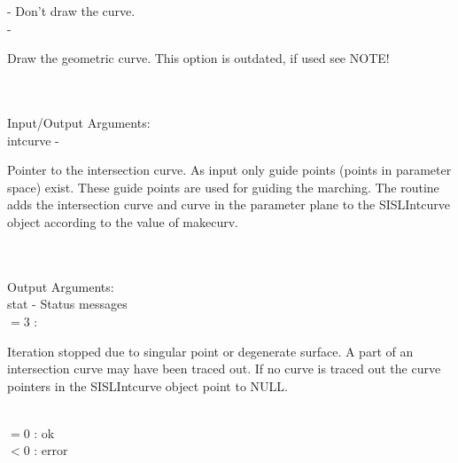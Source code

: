                 \>\>\>\> -     \>Don't draw the curve.\\
                \>\>\>\> -     \>\begin{minipg5}
                                        Draw the geometric curve. This option is
                                        outdated, if used see NOTE!
                                        \end{minipg5} \\[0.8ex]
\\
        \>Input/Output Arguments:\\
        \>\>    {\fov intcurve}\> - \>  \begin{minipg2}
                                Pointer to the intersection curve.
                                As input only
                                guide points (points in parameter space)
                                exist. These guide points
                                are used for guiding the marching.
                                The routine adds the
                                intersection curve and curve in the parameter
                                plane to the SISLIntcurve object according to the value
                                of makecurv.
                                \end{minipg2}\\[0.8ex]
\\
        \>Output Arguments:\\
        \>\>    {\fov stat}     \> - \> Status messages\\
                \>\>\>\>\>      $= 3$ : \>      \begin{minipg5}
                                                Iteration stopped due to singular
                                                point or degenerate surface. A part of
                                                an intersection curve may have been
                                                traced out. If no curve is traced out
                                                the curve pointers in the SISLIntcurve
                                                object point to NULL.
                                                \end{minipg5} \\[0.3ex]
                \>\>\>\>\>      $= 0$   :\> ok\\
                \>\>\>\>\>      $< 0$   :\> error\\
\\
